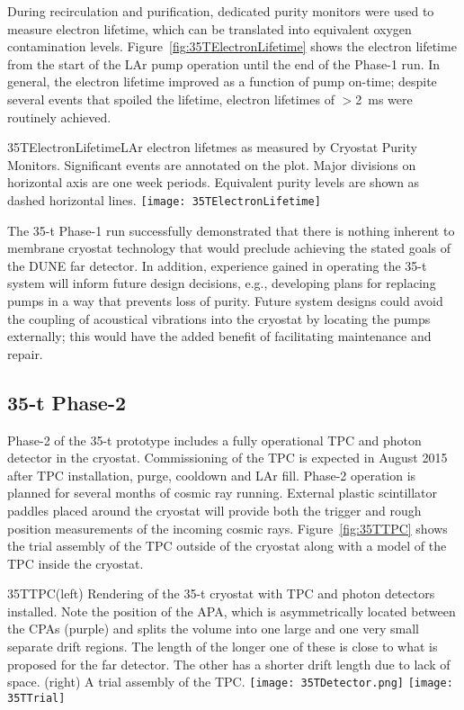 During recirculation and purification, dedicated purity monitors were
used to measure electron lifetime, which can be translated into
equivalent oxygen contamination levels.
Figure~\ref{fig:35TElectronLifetime} shows the electron lifetime from
the start of the LAr pump operation until the end of the Phase-1 run.
In general, the electron lifetime improved as a function of pump
on-time; despite several events that spoiled the lifetime, 
electron lifetimes of $>$2~ms were routinely achieved.
\begin{cdrfigure}{35TElectronLifetime}{LAr electron lifetmes as measured by
Cryostat Purity Monitors. Significant events are annotated on the plot. Major divisions on horizontal axis
are one week periods. Equivalent purity levels are shown as dashed horizontal lines.}
\texttt{[image: 35TElectronLifetime]}
\end{cdrfigure}

The 35-t Phase-1 run successfully demonstrated that there is nothing
inherent to membrane cryostat technology that would preclude achieving
the stated goals of the DUNE far detector. In addition, experience
gained in operating the 35-t system will inform future design
decisions, e.g., developing plans for replacing pumps in a way that
prevents loss of purity.  Future system designs could avoid the
coupling of acoustical vibrations into the cryostat by locating the
pumps externally; this would have the added benefit of facilitating
maintenance and repair.

\subsection{35-t Phase-2}
\label{sec:proto-35t-ph2}

Phase-2 of the 35-t prototype includes a fully operational TPC and
photon detector in the cryostat.  Commissioning of the TPC is expected
in August 2015 after TPC installation, purge, cooldown and LAr fill.
Phase-2 operation is planned for several months of cosmic ray running.
External plastic scintillator paddles placed around the cryostat will
provide both the trigger and rough position measurements of the
incoming cosmic rays.  Figure~\ref{fig:35TTPC} shows the trial
assembly of the TPC outside of the cryostat along with a model of the
TPC inside the cryostat.
\begin{cdrfigure}{35TTPC}{(left) Rendering of the
35-t cryostat with TPC and photon detectors installed.  Note the
position of the APA, which is asymmetrically located between the CPAs
(purple) and splits the volume into one large and one very small %
separate drift regions.  The length of the longer one of these is
close to what is proposed for the far detector.  The other has a
shorter drift length due to lack of space.  (right) A trial assembly
of the TPC.  } \texttt{[image: 35TDetector.png]}
  \texttt{[image: 35TTrial]}
\end{cdrfigure}


